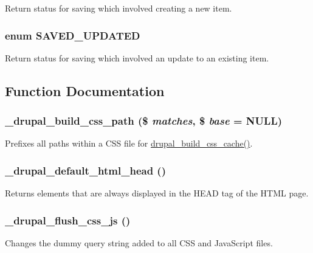 \label{common_8inc_a7d54df6ca81759341e08f451d4f6c8cd}
Return status for saving which involved creating a new item. \hypertarget{common_8inc_a7daf0b68ef3b54562e9999ef017e28cb}{
\subsubsection[{SAVED\_\-UPDATED}]{\setlength{\rightskip}{0pt plus 5cm}enum {\bf SAVED\_\-UPDATED}}}
\label{common_8inc_a7daf0b68ef3b54562e9999ef017e28cb}
Return status for saving which involved an update to an existing item. 

\subsection{Function Documentation}
\hypertarget{common_8inc_af634d8ae0731015c73e039895890b42b}{
\subsubsection[{\_\-drupal\_\-build\_\-css\_\-path}]{\setlength{\rightskip}{0pt plus 5cm}\_\-drupal\_\-build\_\-css\_\-path (\$ {\em matches}, \/  \$ {\em base} = {\ttfamily NULL})}}
\label{common_8inc_af634d8ae0731015c73e039895890b42b}
Prefixes all paths within a CSS file for \hyperlink{common_8inc_af375d76404efdf4468a7157f71c910ee}{drupal\_\-build\_\-css\_\-cache()}. \hypertarget{common_8inc_a140ce21f40afe048c44f2726045d9692}{
\subsubsection[{\_\-drupal\_\-default\_\-html\_\-head}]{\setlength{\rightskip}{0pt plus 5cm}\_\-drupal\_\-default\_\-html\_\-head ()}}
\label{common_8inc_a140ce21f40afe048c44f2726045d9692}
Returns elements that are always displayed in the HEAD tag of the HTML page. \hypertarget{common_8inc_aa53a3c794efc562f46a74688dabf27f6}{
\subsubsection[{\_\-drupal\_\-flush\_\-css\_\-js}]{\setlength{\rightskip}{0pt plus 5cm}\_\-drupal\_\-flush\_\-css\_\-js ()}}
\label{common_8inc_aa53a3c794efc562f46a74688dabf27f6}
Changes the dummy query string added to all CSS and JavaScript files.

